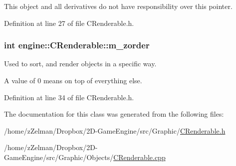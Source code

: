 This object and all derivatives do not have responsibility over this pointer. 



Definition at line 27 of file C\-Renderable.\-h.

\hypertarget{classengine_1_1CRenderable_aaa8555414169f4642d7c74dd25dbb344}{
\subsubsection[{m\-\_\-zorder}]{\setlength{\rightskip}{0pt plus 5cm}int engine\-::\-C\-Renderable\-::m\-\_\-zorder\hspace{0.3cm}{\ttfamily [protected]}}}\label{classengine_1_1CRenderable_aaa8555414169f4642d7c74dd25dbb344}


Used to sort, and render objects in a specific way. 

A value of 0 means on top of everything else. 

Definition at line 34 of file C\-Renderable.\-h.



The documentation for this class was generated from the following files\-:\begin{DoxyCompactItemize}
\item 
/home/z\-Zelman/\-Dropbox/2\-D-\/\-Game\-Engine/src/\-Graphic/\hyperlink{CRenderable_8h}{C\-Renderable.\-h}\item 
/home/z\-Zelman/\-Dropbox/2\-D-\/\-Game\-Engine/src/\-Graphic/\-Objects/\hyperlink{CRenderable_8cpp}{C\-Renderable.\-cpp}\end{DoxyCompactItemize}
